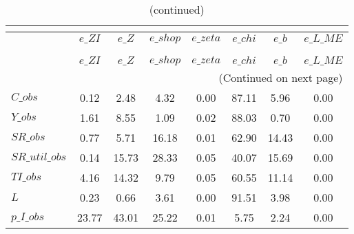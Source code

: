  
\begin{center}
\begin{longtable}{lccccccc} 
\caption{VARIANCE DECOMPOSITION (in percent)}\\
 \label{Table:th_var_decomp_uncond}\\
\toprule 
$               $	 & 	 $      e\_ZI$	 & 	 $       e\_Z$	 & 	 $    e\_shop$	 & 	 $    e\_zeta$	 & 	 $     e\_chi$	 & 	 $       e\_b$	 & 	 $  e\_L\_ME$\\
\midrule \endfirsthead 
\caption{(continued)}\\
 \toprule \\ 
$               $	 & 	 $      e\_ZI$	 & 	 $       e\_Z$	 & 	 $    e\_shop$	 & 	 $    e\_zeta$	 & 	 $     e\_chi$	 & 	 $       e\_b$	 & 	 $  e\_L\_ME$\\
\midrule \endhead 
\midrule \multicolumn{8}{r}{(Continued on next page)} \\ \bottomrule \endfoot 
\bottomrule \endlastfoot 
$C\_obs         $	 & 	        0.12	 & 	        2.48	 & 	        4.32	 & 	        0.00	 & 	       87.11	 & 	        5.96	 & 	        0.00 \\ 
$Y\_obs         $	 & 	        1.61	 & 	        8.55	 & 	        1.09	 & 	        0.02	 & 	       88.03	 & 	        0.70	 & 	        0.00 \\ 
$SR\_obs        $	 & 	        0.77	 & 	        5.71	 & 	       16.18	 & 	        0.01	 & 	       62.90	 & 	       14.43	 & 	        0.00 \\ 
$SR\_util\_obs  $	 & 	        0.14	 & 	       15.73	 & 	       28.33	 & 	        0.05	 & 	       40.07	 & 	       15.69	 & 	        0.00 \\ 
$TI\_obs        $	 & 	        4.16	 & 	       14.32	 & 	        9.79	 & 	        0.05	 & 	       60.55	 & 	       11.14	 & 	        0.00 \\ 
$L              $	 & 	        0.23	 & 	        0.66	 & 	        3.61	 & 	        0.00	 & 	       91.51	 & 	        3.98	 & 	        0.00 \\ 
$p\_I\_obs      $	 & 	       23.77	 & 	       43.01	 & 	       25.22	 & 	        0.01	 & 	        5.75	 & 	        2.24	 & 	        0.00 \\ 
\end{longtable}
 \end{center}
